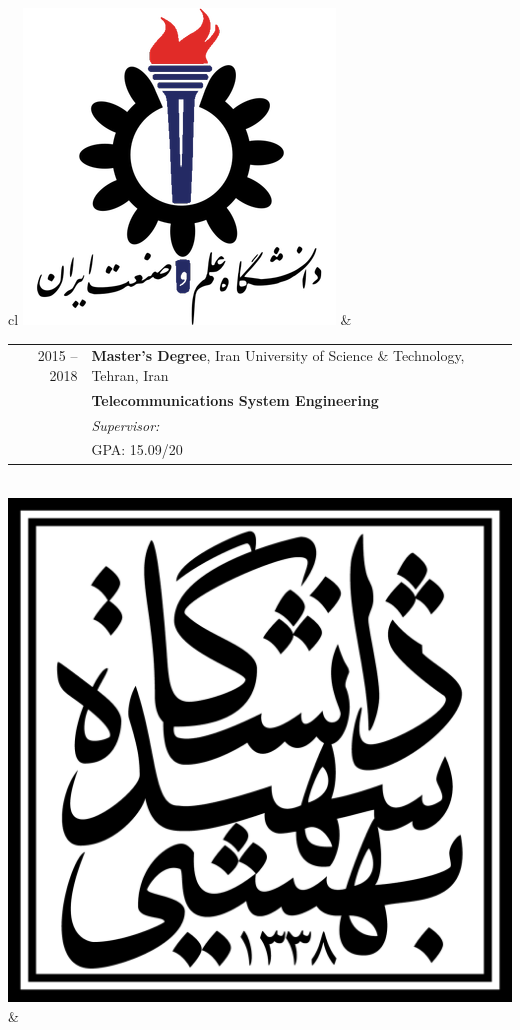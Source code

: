 
\begin{tabular}{cl}
	\includegraphics[scale=0.12]{graphics/IUST_logo_color} & 
	\begin{tabular}{rl}
		\textsc{2015 --2018} & \textbf{Master’s Degree},  Iran University of Science \& Technology,  Tehran, Iran                            \\
		                     & \textbf{Telecommunications System Engineering}                                                                       \\
		                     & \emph{Supervisor: \link{http://www.iust.ac.ir/content/45110/Dr.-Haddadi}{Assistant Professor Farzan Haddadi}} \\
		                     & \textsc{GPA}: 15.09/20                                                                                        \\
	\end{tabular}
	\\
	\includegraphics[scale=0.05]{graphics/SBU_logo}        & 

\end{tabular}
